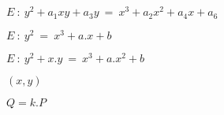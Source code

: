 \documentclass{article}
\begin{document}
$ E ~:~ y^{2} + a_{1}xy + a_{3}y ~=~ x^{3} + a_{2}x^{2} + a_{4}x + a_{6} $
\pagebreak

$ E ~:~ y^{2}~=~x^3+a.x+b $
\pagebreak

$ E ~:~ y^{2} + x.y ~=~x^3+ a.x^2 + b $
\pagebreak

$ (x,y) $
\pagebreak

$ Q = k.P $
\pagebreak
\end{document}
